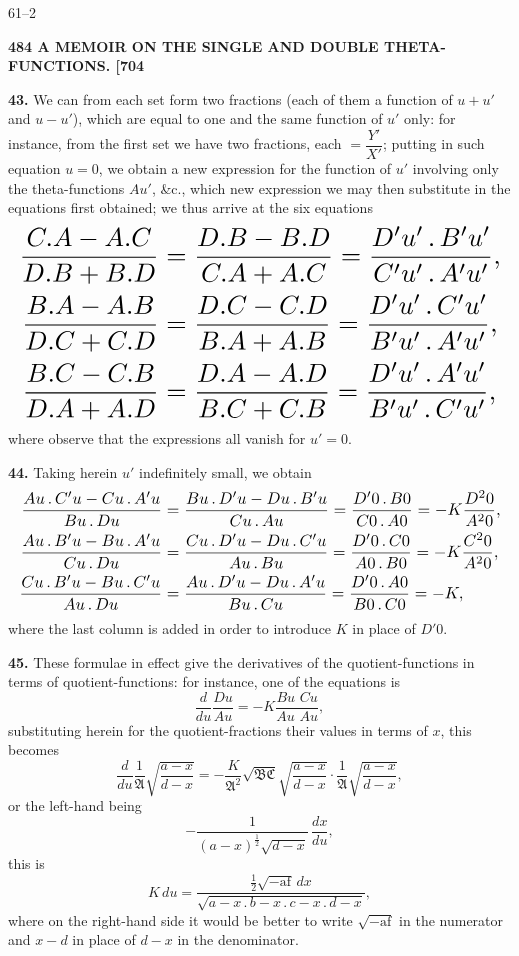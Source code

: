 \documentclass[11pt]{article}
\newcommand{\Ag}{\mathfrak{A}}
\newcommand{\Bg}{\mathfrak{B}}
\newcommand{\Cg}{\mathfrak{C}}
\begin{document}
\hfill 61--2

\bigskip
\noindent\textbf{484 \hfill A MEMOIR ON THE SINGLE AND DOUBLE THETA-FUNCTIONS. \hfill [704}

\medskip
\textbf{43.} We can from each set form two fractions (each of them a function of $u+u'$ and $u-u'$), which are equal to one and the same function of $u'$ only: for instance, from the first set we have two fractions, each $=\dfrac{Y'}{X'}$; putting in such equation $u=0$, we obtain a new expression for the function of $u'$ involving only the theta-functions $Au'$, \&c., which new expression we may then substitute in the equations first obtained; we thus arrive at the six equations
\[
\resizebox{\textwidth}{!}{$\displaystyle
\begin{aligned}
\frac{C.A-A.C}{D.B+B.D} &= \frac{D.B-B.D}{C.A+A.C} = \frac{D'u'\,.\,B'u'}{C'u'\,.\,A'u'},\\
\frac{B.A-A.B}{D.C+C.D} &= \frac{D.C-C.D}{B.A+A.B} = \frac{D'u'\,.\,C'u'}{B'u'\,.\,A'u'},\\
\frac{B.C-C.B}{D.A+A.D} &= \frac{D.A-A.D}{B.C+C.B} = \frac{D'u'\,.\,A'u'}{B'u'\,.\,C'u'},
\end{aligned}$}
\]
where observe that the expressions all vanish for $u'=0$.

\medskip
\textbf{44.} Taking herein $u'$ indefinitely small, we obtain
\[
\resizebox{\textwidth}{!}{$\displaystyle
\begin{aligned}
\frac{Au\,.\,C'u-Cu\,.\,A'u}{Bu\,.\,Du} &= \frac{Bu\,.\,D'u-Du\,.\,B'u}{Cu\,.\,Au} = \frac{D'0\,.\,B0}{C0\,.\,A0} = -K\frac{D^2 0}{A^2 0},\\
\frac{Au\,.\,B'u-Bu\,.\,A'u}{Cu\,.\,Du} &= \frac{Cu\,.\,D'u-Du\,.\,C'u}{Au\,.\,Bu} = \frac{D'0\,.\,C0}{A0\,.\,B0} = -K\frac{C^2 0}{A^2 0},\\
\frac{Cu\,.\,B'u-Bu\,.\,C'u}{Au\,.\,Du} &= \frac{Au\,.\,D'u-Du\,.\,A'u}{Bu\,.\,Cu} = \frac{D'0\,.\,A0}{B0\,.\,C0} = -K,
\end{aligned}$}
\]
where the last column is added in order to introduce $K$ in place of $D'0$.

\medskip
\textbf{45.} These formulae in effect give the derivatives of the quotient-functions in terms of quotient-functions: for instance, one of the equations is
\[
\frac{d}{du}\frac{Du}{Au} = -K\frac{Bu\,\,Cu}{Au\,\,Au},
\]
substituting herein for the quotient-fractions their values in terms of $x$, this becomes
\[
\frac{d}{du}\frac{1}{\Ag}\sqrt{\frac{a-x}{d-x}} = -\frac{K}{\Ag^2}\sqrt{\Bg\Cg}\sqrt{\frac{a-x}{d-x}}\cdot\frac{1}{\Ag}\sqrt{\frac{a-x}{d-x}},
\]
or the left-hand being
\[
-\frac{1}{(a-x)^{\frac{1}{2}}\sqrt{d-x}}\,\frac{dx}{du},
\]
this is
\[
K\,du = \frac{\frac{1}{2}\sqrt{-\mathrm{a}\mathrm{f}}\,dx}{\sqrt{a-x\,.\,b-x\,.\,c-x\,.\,d-x}},
\]
where on the right-hand side it would be better to write $\sqrt{-\mathrm{a}\mathrm{f}}$ in the numerator and $x-d$ in place of $d-x$ in the denominator.
\end{document}
